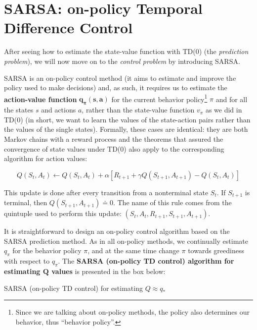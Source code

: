 \section{SARSA: on-policy Temporal Difference Control}
After seeing how to estimate the state-value function with TD(0) (the \textit{prediction problem}), we will now move on to the \textit{control problem} by introducing SARSA.

SARSA is an on-policy control method (it aims to estimate and improve the policy used to make decisions) and, as such, it requires us to estimate the \textbf{action-value function} $\boldsymbol{q_\pi (s,a)}$ for the current behavior policy\footnote{Since we are talking about on-policy methods, the policy also determines our behavior, thus ``behavior policy''.}  $\pi$ and for all the states $s$ and actions $a$, rather than the state-value function $v_\pi$ as we did in TD(0) (in short, we want to learn the values of the state-action pairs rather than the values of the single states). Formally, these cases are identical: they are both Markov chains with a reward process and the theorems that assured the convergence of state values under TD(0) also apply to the corresponding algorithm for action values:

\begin{equation}
    Q(S_t,A_t) \leftarrow Q(S_t,A_t) + \alpha \left[ R_{t+1} + \gamma Q(S_{t+1},A_{t+1}) - Q(S_t,A_t) \right]
    \label{eq:ch5-sarsaupdaterule}
\end{equation}

This update is done after every transition from a nonterminal state $S_t$. If $S_{t+1}$ is terminal, then $Q(S_{t+1},A_{t+1}) \doteq 0$. The name of this rule comes from the quintuple used to perform this update: $\left(S_t,A_t,R_{t+1},S_{t+1},A_{t+1}\right)$.

It is straightforward to design an on-policy control algorithm based on the SARSA prediction method. As in all on-policy methods, we continually estimate $q_\pi$ for the behavior policy $\pi$, and at the same time change $\pi$ towards greediness with respect to $q_\pi$. The \textbf{SARSA (on-policy TD control) algorithm for estimating $\boldsymbol{Q}$ values} is presented in the box below:

\begin{algorithm}[H]
\DontPrintSemicolon
\SetAlgoVlined
\Parameters{step size $\alpha \in \left] 0,1 \right]$, small $\varepsilon > 0$}

\caption{SARSA (on-policy TD control) for estimating $Q \approx q_*$}
\end{algorithm}

